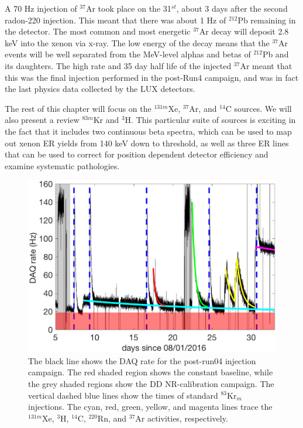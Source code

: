 A 70 Hz injection of $^{37}$Ar took place on the 31$^{st}$, about 3 days after the second radon-220 injection. This meant that there was about 1 Hz of $^{212}$Pb remaining in the detector. The most common and most energetic $^{37}$Ar decay will deposit 2.8 keV into the xenon via x-ray. The low energy of the decay means that the $^{37}$Ar events will be well separated from the MeV-level alphas and betas of $^{212}$Pb and its daughters. The high rate and 35 day half life of the injected $^{37}$Ar meant that this was the final injection performed in the post-Run4 campaign, and was in fact the last physics data collected by the LUX detectors.

The rest of this chapter will focus on the $^{131m}$Xe, $^{37}$Ar, and $^{14}$C sources. We will also present a review $^{83m}$Kr and $^{3}$H. This particular suite of sources is exciting in the fact that it includes two continuous beta spectra, which can be used to map out xenon ER yields from 140 keV down to threshold, as well as three ER lines that can be used to correct for position dependent detector efficiency and examine systematic pathologies.
\begin{figure}[h!]
\centering
\includegraphics[width=\textwidth]{Figures/post_Run4_DAQrate.eps}
\caption{The black line shows the DAQ rate for the post-run04 injection campaign. The red shaded region shows the constant baseline, while the grey shaded regions show the DD NR-calibration campaign. The vertical dashed blue lines show the times of standard $^{83}$Kr$_m$ injections. The cyan, red, green, yellow, and magenta lines trace the $^{131m}$Xe, $^{3}$H, $^{14}$C, $^{220}$Rn, and $^{37}$Ar activities, respectively.} 
\label{fig:DAQrate}
\end{figure}



